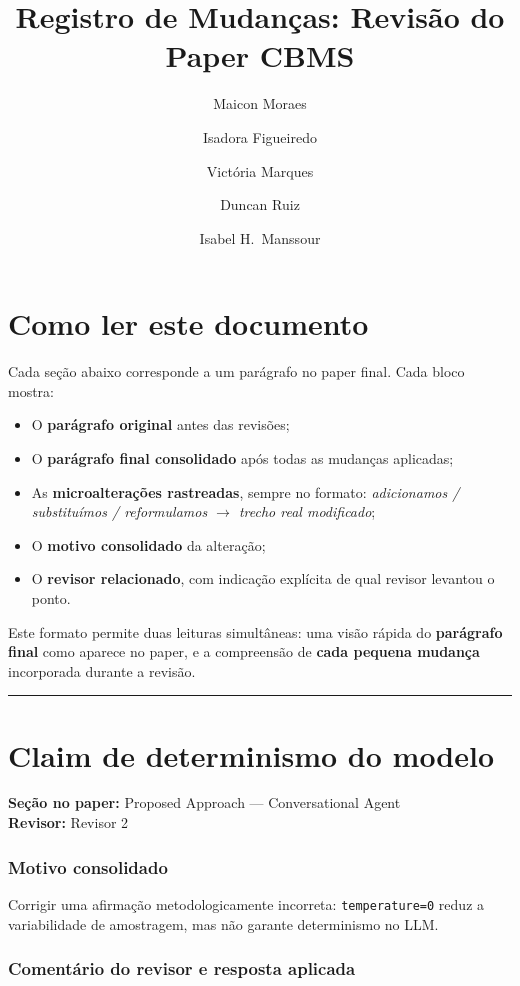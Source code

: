 \documentclass[11pt,a4paper]{article}
\title{\textbf{Registro de Mudanças: Revisão do Paper CBMS}}
\author{Maicon Moraes \and Isadora Figueiredo \and Victória Marques \and Duncan Ruiz \and Isabel H.\ Manssour}
\date{}
\begin{document}
\maketitle

\section*{Como ler este documento}

Cada seção abaixo corresponde a um parágrafo no paper final. Cada bloco mostra:
\begin{itemize}
  \item O \textbf{parágrafo original} antes das revisões;
  \item O \textbf{parágrafo final consolidado} após todas as mudanças aplicadas;
  \item As \textbf{microalterações rastreadas}, sempre no formato: \textit{adicionamos / substituímos / reformulamos $\to$ trecho real modificado};
  \item O \textbf{motivo consolidado} da alteração;
  \item O \textbf{revisor relacionado}, com indicação explícita de qual revisor levantou o ponto.
\end{itemize}

\noindent Este formato permite duas leituras simultâneas: uma visão rápida do \textbf{parágrafo final} como aparece no paper, e a compreensão de \textbf{cada pequena mudança} incorporada durante a revisão.

\bigskip\hrule\bigskip

\section{Claim de determinismo do modelo}

\textbf{Seção no paper:} Proposed Approach — Conversational Agent\\
\textbf{Revisor:} Revisor 2

\subsubsection*{Motivo consolidado}

Corrigir uma afirmação metodologicamente incorreta: \texttt{temperature=0} reduz a variabilidade de amostragem, mas não garante determinismo no LLM.

\subsubsection*{Comentário do revisor e resposta aplicada}
\end{document}
